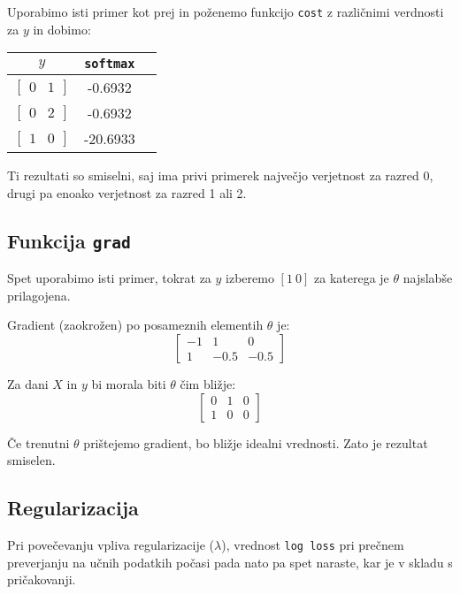 \documentclass[10pt,a4paper]{article}
\begin{document}
Uporabimo isti primer kot prej in poženemo funkcijo \texttt{cost} z različnimi verdnosti za $y$ in dobimo:
\begin{center}
	\renewcommand{\arraystretch}{1.5}
	\begin{tabular}{c | c  c }
		$y$ & \texttt{softmax}\\ \hline
		$\begin{bmatrix} 0 & 1 \end{bmatrix}$ & -0.6932 \\
		$\begin{bmatrix} 0 & 2 \end{bmatrix}$ & -0.6932 \\
		$\begin{bmatrix} 1 & 0 \end{bmatrix}$ & -20.6933 \\
	\end{tabular}
\end{center}

Ti rezultati so smiselni, saj ima privi primerek največjo verjetnost za razred 0, drugi pa enoako verjetnost za razred 1 ali 2.


\subsection*{Funkcija \texttt{grad}}
Spet uporabimo isti primer, tokrat za $y$ izberemo $[1 \ 0]$ za katerega je $\theta$ najslabše prilagojena.

Gradient (zaokrožen) po posameznih elementih $\theta$ je:
\[ \begin{bmatrix}
	-1 &  1 & 0 \\
	1 & -0.5 & -0.5
\end{bmatrix}\]

Za dani $X$ in $y$ bi morala biti $\theta$ čim bližje:
\[ \begin{bmatrix}
	0 &  1 & 0 \\
	1 & 0 & 0
\end{bmatrix}\]

Če trenutni $\theta$ prištejemo gradient, bo bližje idealni vrednosti. Zato je rezultat smiselen.

\subsection*{Regularizacija}
Pri povečevanju vpliva regularizacije ($\lambda$), vrednost \texttt{log loss} pri prečnem preverjanju na učnih podatkih počasi pada nato 
pa spet naraste, kar je v skladu s pričakovanji.
\end{document}
